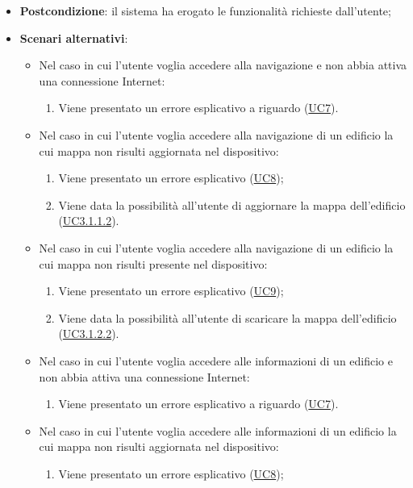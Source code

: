 \documentclass[../AnalisiDeiRequisiti.tex]{subfiles}
\begin{document}
\begin{itemize}
\begin{enumerate}
	\end{enumerate}
	\item \textbf{Postcondizione}: il sistema ha erogato le funzionalità richieste dall'utente;
	\item \textbf{Scenari alternativi}: 
	\begin{itemize}
		\item Nel caso in cui l'utente voglia accedere alla navigazione e non abbia attiva una connessione Internet: 
		\begin{enumerate}
			\item Viene presentato un errore esplicativo a riguardo (\hyperlink{UC7}{UC7}).
		\end{enumerate}
		\item Nel caso in cui l'utente voglia accedere alla navigazione di un edificio la cui mappa non risulti aggiornata nel dispositivo: 
		\begin{enumerate}
			\item Viene presentato un errore esplicativo (\hyperlink{UC8}{UC8});
			\item Viene data la possibilità all'utente di aggiornare la mappa dell'edificio (\hyperlink{UC3.1.1.2}{UC3.1.1.2}).
		\end{enumerate}
		\item Nel caso in cui l'utente voglia accedere alla navigazione di un edificio la cui mappa non risulti presente nel dispositivo: 
		\begin{enumerate}
			\item Viene presentato un errore esplicativo (\hyperlink{UC9}{UC9});
			\item Viene data la possibilità all'utente di scaricare la mappa dell'edificio (\hyperlink{UC3.1.2.2}{UC3.1.2.2}).
		\end{enumerate}
		\item Nel caso in cui l'utente voglia accedere alle informazioni di un edificio e non abbia attiva una connessione Internet: 
		\begin{enumerate}
			\item Viene presentato un errore esplicativo a riguardo (\hyperlink{UC7}{UC7}).
		\end{enumerate}
		\item Nel caso in cui l'utente voglia accedere alle informazioni di un edificio la cui mappa non risulti aggiornata nel dispositivo: 
		\begin{enumerate}
			\item Viene presentato un errore esplicativo (\hyperlink{UC8}{UC8});

\end{enumerate}
\end{itemize}
\end{itemize}
\end{document}
